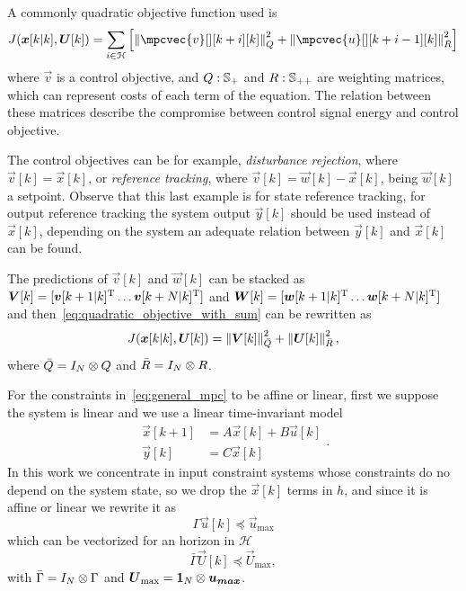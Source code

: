 \documentclass[../main.tex]{subfiles}
\begin{document}
A commonly quadratic objective function used is
\begin{equation}
  \label{eq:quadratic_objective_with_sum}
  J(\vec{x}[k|k],\vec{U}[k])=\sum_{i\in\set{H}}\left[\norm{\mpcvec{v}[ ][k+i][k]}^{2}_{Q} +\norm{\mpcvec{u}[ ][k+i-1][k]}^{2}_{R}\right]
\end{equation}
where $\vec{v}$ is a control objective, and ${ Q:\mathbb{S}_{+} }$ and ${ R:\mathbb{S}_{++} }$ are weighting matrices, which can represent costs of each term of the equation. The relation between these matrices describe the compromise between control signal energy and control objective.

The control objectives can be for example, \emph{disturbance rejection}, where ${ \vec{v}[k]=\vec{x}[k] }$, or \emph{reference tracking}, where ${ \vec{v}[k]=\vec{w}[k]-\vec{x}[k] }$, being $\vec{w}[k]$ a setpoint.
Observe that this last example is for state reference tracking, for output reference tracking the system output $\vec{y}[k]$ should be used instead of $\vec{x}[k]$, depending on the system an adequate relation between $\vec{y}[k]$ and $\vec{x}[k]$ can be found.

The predictions of $\vec{v}[k]$ and $\vec{w}[k]$ can be stacked as ${ \boldsymbol{V}[k]=[\boldsymbol{v}[k+1|k]^{\mathrm{T}} \dots \boldsymbol{v}[k+N|k]^{\mathrm{T}}] }$ and
${ \boldsymbol{W}[k]=[\boldsymbol{w}[k+1|k]^{\mathrm{T}} \dots \boldsymbol{w}[k+N|k]^{\mathrm{T}}] }$ and then~\eqref{eq:quadratic_objective_with_sum} can be rewritten as
\begin{equation}
  \label{eq:quadratic_objective_compact}
  J(\boldsymbol{x}[k|k],\boldsymbol{U}[k])=\left\lVert\boldsymbol{V}[k]\right\rVert^{2}_{\bar{Q}} + \left\lVert\boldsymbol{U}[k] \right\rVert^{2}_{\bar{R}},
\end{equation}
where $\bar{Q}=I_{N}\otimes Q$ and
$\bar{R}=I_{N}\otimes R$.

For the constraints in~\eqref{eq:general_mpc} to be affine or linear, first we suppose the system is linear and we use a linear time-invariant model
\begin{equation}
  \begin{array}{rl}
    \vec{x}[k+1]&=A\vec{x}[k]+B\vec{u}[k]\\
    \vec{y}[k]&=C\vec{x}[k]
  \end{array}
.
\end{equation}
In this work we concentrate in input constraint systems whose constraints do no depend on the system state, so we drop the $\vec{x}[k]$ terms in $h$, and since it is affine or linear we rewrite it as
\begin{equation}
  \Gamma\vec{u}[k]\preceq\vec{u}_{\max}
\end{equation}
which can be vectorized for an horizon in $\mathcal{H}$
\begin{equation}
\bar{\Gamma}\vec{U}[k]\preceq {\vec{U}}_{\text{max}},
\end{equation}
with ${ \bar{\Gamma}=I_{N}\otimes\Gamma }$ and ${ \boldsymbol{U}_{\max}=\mathbf{1}_{N}\otimes\boldsymbol{u_{max}} }$.
\end{document}

